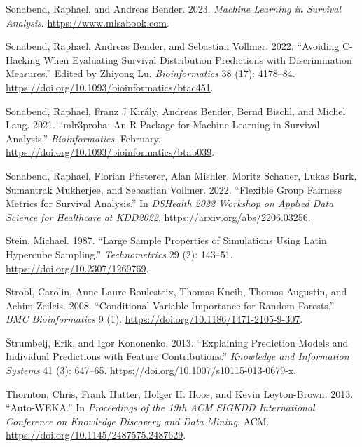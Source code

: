 \begin{CSLReferences}{1}{0}
\leavevmode{}%
Sonabend, Raphael, and Andreas Bender. 2023. \emph{Machine Learning in
Survival Analysis}. \url{https://www.mlsabook.com}.

\leavevmode{}%
Sonabend, Raphael, Andreas Bender, and Sebastian Vollmer. 2022.
{``Avoiding {C}-Hacking When Evaluating Survival Distribution
Predictions with Discrimination Measures.''} Edited by Zhiyong Lu.
\emph{Bioinformatics} 38 (17): 4178--84.
\url{https://doi.org/10.1093/bioinformatics/btac451}.

\leavevmode{}%
Sonabend, Raphael, Franz J Király, Andreas Bender, Bernd Bischl, and
Michel Lang. 2021. {``{mlr3proba}: An {R} Package for Machine Learning
in Survival Analysis.''} \emph{Bioinformatics}, February.
\url{https://doi.org/10.1093/bioinformatics/btab039}.

\leavevmode{}%
Sonabend, Raphael, Florian Pfisterer, Alan Mishler, Moritz Schauer,
Lukas Burk, Sumantrak Mukherjee, and Sebastian Vollmer. 2022.
{``Flexible Group Fairness Metrics for Survival Analysis.''} In
\emph{DSHealth 2022 Workshop on Applied Data Science for Healthcare at
KDD2022}. \url{https://arxiv.org/abs/2206.03256}.

\leavevmode{}%
Stein, Michael. 1987. {``Large Sample Properties of Simulations Using
Latin Hypercube Sampling.''} \emph{Technometrics} 29 (2): 143--51.
\url{https://doi.org/10.2307/1269769}.

\leavevmode{}%
Strobl, Carolin, Anne-Laure Boulesteix, Thomas Kneib, Thomas Augustin,
and Achim Zeileis. 2008. {``Conditional Variable Importance for Random
Forests.''} \emph{{BMC} Bioinformatics} 9 (1).
\url{https://doi.org/10.1186/1471-2105-9-307}.

\leavevmode{}%
Štrumbelj, Erik, and Igor Kononenko. 2013. {``Explaining Prediction
Models and Individual Predictions with Feature Contributions.''}
\emph{Knowledge and Information Systems} 41 (3): 647--65.
\url{https://doi.org/10.1007/s10115-013-0679-x}.

\leavevmode{}%
Thornton, Chris, Frank Hutter, Holger H. Hoos, and Kevin Leyton-Brown.
2013. {``Auto-{WEKA}.''} In \emph{Proceedings of the 19th {ACM} {SIGKDD}
International Conference on Knowledge Discovery and Data Mining}. {ACM}.
\url{https://doi.org/10.1145/2487575.2487629}.


\end{CSLReferences}
